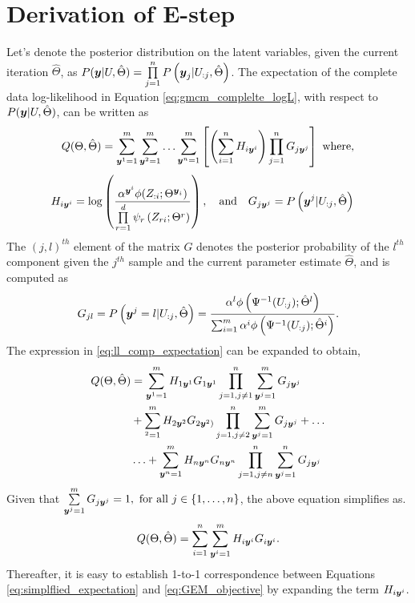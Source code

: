 \documentclass{article}
\theoremstyle{plain}
\theoremstyle{definition}
\theoremstyle{remark}
\begin{document}
\section{Derivation of E-step}\label{apd:EStep_derivation}
Let's denote the posterior distribution on the latent variables, given the current iteration $\hat{\Theta}$, as $P(\boldsymbol{y}|U,\hat{\Theta}) = \prod\limits_{j=1}^{n}P\left(\boldsymbol{y}_j|U_{:j},\hat{\Theta} \right)$.  The expectation of the complete data log-likelihood in Equation \eqref{eq:gmcm_complelte_logL}, with respect to $P(\boldsymbol{y}|U,\hat{\Theta})$,  can be written as
\begin{align} \label{eq:ll_comp_expectation}
Q(\Theta,\hat{\Theta})=\sum\limits_{\boldsymbol{y}^1=1}^m \sum\limits_{\boldsymbol{y}^2=1}^m \ldots \sum\limits_{\boldsymbol{y}^n=1}^m \left[ \left( \sum\limits_{i=1}^{n}H_{i\boldsymbol{y}^i}  \right) \prod\limits_{j=1}^{n}G_{j\boldsymbol{y}^j} \right] \text{  where,}
\end{align}
\begin{align*}
H_{i\boldsymbol{y}^i} &= \log \left(\frac{\alpha^{\boldsymbol{y}^i}\phi(Z_{:i}; \Theta^{\boldsymbol{y}_i})}{\prod\limits_{r=1}^{d}\psi_{r}\left(Z_{r{i}};\Theta^r \right)} \right),\quad\text{and}\quad
G_{j\boldsymbol{y}^j} = P\left(\boldsymbol{y}^j|U_{:j},\hat{\Theta}\right) \nonumber
\end{align*} 
The $(j,l)^{th}$ element of the matrix $G$ denotes the posterior probability of the $l^{th}$ component given the $j^{th}$ sample and the current parameter estimate $\hat{\Theta}$, and is computed as
\begin{align} \label{eq:latent_posterior_matrix}
G_{jl}=P\left(\boldsymbol{y}^j=l|U_{:j},\hat{\Theta}\right)=\frac{\alpha^l\phi\left(\Psi^{-1}(U_{:j}); \hat{\Theta}^l\right)}{\sum_{i=1}^m\alpha^i\phi\left(\Psi^{-1}(U_{:j}); \hat{\Theta}^i\right)}.
\end{align}
The expression in \ref{eq:ll_comp_expectation} can be expanded to obtain,
\begin{align}
Q(\Theta,\hat{\Theta}) &= \sum\limits_{\boldsymbol{y}^1=1}^m H_{1\boldsymbol{y}^1}G_{1\boldsymbol{y}^1} \prod\limits_{j=1,j\neq 1}^n \sum\limits_{\boldsymbol{y}^j=1}^m G_{j\boldsymbol{y}^j} \nonumber \\
& + \sum\limits_{\boldsymbol{}^2=1}^m H_{2\boldsymbol{y}^2}G_{2\boldsymbol{y}^2)}\prod\limits_{j=1,j\neq 2}^n \sum\limits_{\boldsymbol{y}^j=1}^m G_{j\boldsymbol{y}^j} + \ldots  \nonumber \\ 
& \ldots + \sum\limits_{\boldsymbol{y}^n=1}^m H_{n\boldsymbol{y}^n}G_{n\boldsymbol{y}^n}\prod\limits_{j=1,j\neq n}^n \sum\limits_{\boldsymbol{y}^j=1}^n G_{j\boldsymbol{y}^j}
\end{align}
Given that $\sum\limits_{\boldsymbol{y}^j=1}^m G_{j\boldsymbol{y}^j} = 1, \text{ for all }  j \in \{1,\ldots, n\} $, the above equation simplifies as.
\begin{equation} \label{eq:simplflied_expectation}
Q(\Theta,\hat{\Theta}) = \sum\limits_{i=1}^{n}\sum\limits_{\boldsymbol{y}^i=1}^m H_{i\boldsymbol{y}^i}G_{i\boldsymbol{y}^i}.
\end{equation}
Thereafter, it is easy to establish 1-to-1 correspondence between Equations \eqref{eq:simplflied_expectation} and \eqref{eq:GEM_objective} by expanding the term $H_{i\boldsymbol{y}^i}$.
\end{document}
